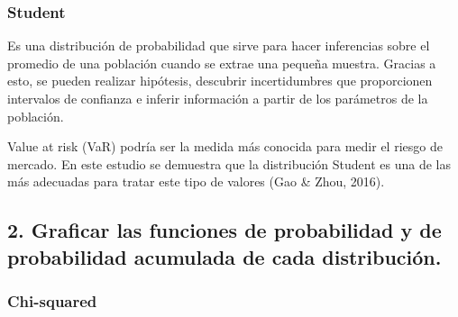 \documentclass[
]{article}
\begin{document}
\hypertarget{student}{%
\subsubsection{Student}\label{student}}

Es una distribución de probabilidad que sirve para hacer inferencias
sobre el promedio de una población cuando se extrae una pequeña muestra.
Gracias a esto, se pueden realizar hipótesis, descubrir incertidumbres
que proporcionen intervalos de confianza e inferir información a partir
de los parámetros de la población.

Value at risk (VaR) podría ser la medida más conocida para medir el
riesgo de mercado. En este estudio se demuestra que la distribución
Student es una de las más adecuadas para tratar este tipo de valores
(Gao \& Zhou, 2016).

\hypertarget{graficar-las-funciones-de-probabilidad-y-de-probabilidad-acumulada-de-cada-distribuciuxf3n.}{%
\subsection{2. Graficar las funciones de probabilidad y de probabilidad
acumulada de cada
distribución.}\label{graficar-las-funciones-de-probabilidad-y-de-probabilidad-acumulada-de-cada-distribuciuxf3n.}}

\hypertarget{chi-squared-1}{%
\subsubsection{Chi-squared}\label{chi-squared-1}}
\end{document}
